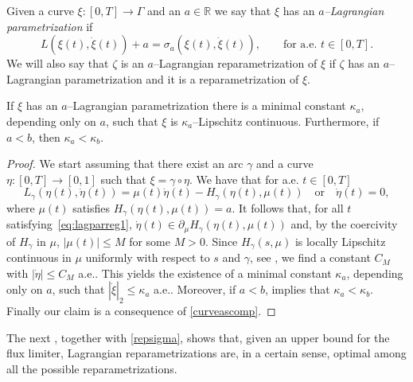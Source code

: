 \documentclass[11pt,a4paper,american]{article}
\newcommand{\Rds}{\mathds R}
\begin{document}
    \begin{defin}\label{lagpardef}
        Given a curve $\xi:[0,T]\to\Gamma$ and an $a\in\Rds$ we say that $\xi$ has an \emph{$a$--Lagrangian parametrization} if
        \begin{equation*}
            L\left(\xi(t),\dot\xi(t)\right)+a=\sigma_a\left(\xi(t),\dot\xi(t)\right),\qquad\text{for a.e. }t\in[0,T].
        \end{equation*}
        We will also say that $\zeta$ is an $a$--Lagrangian reparametrization of $\xi$ if $\zeta$ has an $a$--Lagrangian parametrization and it is a reparametrization of $\xi$.
    \end{defin}

    \begin{prop}\label{lagparreg}
        If $\xi$ has an $a$--Lagrangian parametrization there is a minimal constant $\kappa_a$, depending only on $a$, such that $\xi$ is $\kappa_a$--Lipschitz continuous. Furthermore, if $a<b$, then $\kappa_a<\kappa_b$.
    \end{prop}
    \begin{proof}
        We start assuming that there exist an arc $\gamma$ and a curve $\eta:[0,T]\to[0,1]$ such that $\xi=\gamma\circ\eta$. We have that for a.e. $t\in[0,T]$
        \begin{equation}\label{eq:lagparreg1}
            L_\gamma(\eta(t),\dot\eta(t))=\mu(t)\dot\eta(t)-H_\gamma(\eta(t),\mu(t))\quad\text{or}\quad\dot\eta(t)=0,
        \end{equation}
        where $\mu(t)$ satisfies $H_\gamma(\eta(t),\mu(t))=a$. It follows that, for all $t$ satisfying~\cref{eq:lagparreg1}, $\dot\eta(t)\in\partial_\mu H_\gamma(\eta(t),\mu(t))$ and, by the coercivity of $H_\gamma$ in $\mu$, $|\mu(t)|\le M$ for some $M>0$. Since $H_\gamma(s,\mu)$ is locally Lipschitz continuous in $\mu$ uniformly with respect to $s$ and $\gamma$, see \cite[Corollary to Proposition 2.2.6]{Clarke90}, we find a constant $C_M$ with $|\dot\eta|\le C_M$ a.e.. This yields the existence of a minimal constant $\kappa_a$, depending only on $a$, such that $|\dot\xi|_2\le\kappa_a$ a.e.. Moreover, if $a<b$,  implies that $\kappa_a<\kappa_b$. Finally our claim is a consequence of \cref{curveascomp}.
    \end{proof}

    The next , together with \cref{repsigma}, shows that, given an upper bound for the flux limiter, Lagrangian reparametrizations are, in a certain sense, optimal among all the possible reparametrizations.
\end{document}
